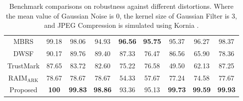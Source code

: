 \documentclass{article}
\begin{document}
\begin{table}[]
{\begin{tabular}{ccccccccc}
MBRS                  & 99.18    & 98.06                                                                 & 94.93                                                                  & \textbf{96.56}                                                   & \textbf{95.75}                                                & 95.37                                                       & 96.27                                                           &  98.37                                                         \\
DWSF                  & 90.17    & 89.76                                                                 & 89.40                                                                  & 87.33                                                   & 76.47                                                & 86.56                                                       & 65.90                                                           & 78.36                                                     \\
TrustMark             & 87.65    & 83.72                                                                 & 82.60                                                                  & 75.22                                                   & 76.58                                                & 49.50                                                       & 62.13                                                           & 87.25                                                     \\
RAIM$_{\mathrm{ARK}}$ & 78.67    & 78.67                                                                 & 78.67                                                                  & 54.33                                                   & 57.67                                                & 77.24                                                          & 74.58                                                           & 77.67                                                     \\
Proposed              & \textbf{100}      & \textbf{99.83}                                                                 & \textbf{98.86}                                                                  & 93.36                                                   & 95.13                                                & \textbf{99.73}                                                       & \textbf{99.59}                                                           & \textbf{99.93}                                                     \\ \bottomrule
\end{tabular}
}
\caption{Benchmark comparisons on robustness against different distortions. Where the mean value of Gaussian Noise is 0, the kernel size of Gaussian Filter is 3, and JPEG Compression is simulated using Kornia \cite{eriba2019kornia}.}
\label{table:rb}
\end{table}
\end{document}
